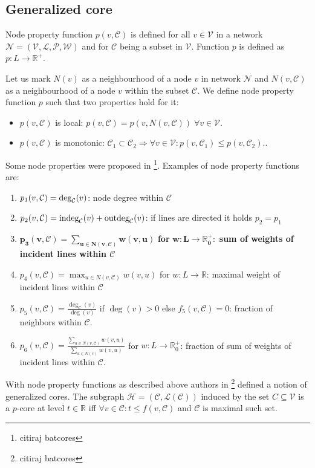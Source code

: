 \documentclass[a4paper,twoside,10pt]{article}
\newcommand{\Deg}{\mbox{\rm{deg}}}
\newcommand{\C}{\mathcal{C}}
\newcommand{\R}{\mathbb{R}}
\newcommand{\indeg}{\mbox{\rm{indeg}}}
\newcommand{\outdeg}{\mbox{\rm{outdeg}}}
\begin{document}
\subsection{Generalized core}

Node property function $p(v, \C)$ is defined for all $v \in \mathcal{V}$
in a network $\mathcal{N} = (\mathcal{V}, \mathcal{L}, \mathcal{P}, \mathcal{W})$ and for $\C$ being a subset in $\mathcal{V}$. Function $p$ is defined as $p: L \longrightarrow \R^+$.

Let us mark $N(v)$ as a neighbourhood of a node $v$ in network $\mathcal{N}$ and $N(v, \C)$ as a neighbourhood of a node $v$ within the subset $\C$. We define node property function $p$ such that two properties hold for it:
\begin{itemize}
\item $p(v, \C)$ is local: $p(v, \C) = p(v, N(v, \C)) \; \forall v \in \mathcal{V}$.
\item $p(v, \C)$ is monotonic: $\C_1 \subset \C_2 \Rightarrow \forall v \in \mathcal{V}: p(v, \C_1) \leq p(v, \C_2).$.
\end{itemize}

Some node properties were proposed in \footnote{citiraj batcores}. Examples of node property functions are:
\begin{enumerate}
\item $p_1 (v, \C) = \Deg_{\C}(v)$: node degree within $\C$
\item $p_2 (v, \C) = \indeg_{\C}(v) + \outdeg_{\C}(v)$: if lines are directed it holds $p_2 = p_1$
\item $\mathbf{p_3 (v, \C) = \sum_{u \in N(v, \C)} w(v,u)}$ \textbf{for} $\mathbf{w: L \rightarrow \mathbb{R}_0^+:}$ \textbf{sum of weights of incident lines within $\C$}
\item $p_4 (v, \C) = \max_{u \in N(v, \C)} w(v, u)$ for $w: L \rightarrow \mathbb{R}$: maximal weight of incident lines within $\C$
\item $p_5 (v, \C) = \frac{\deg_{\C}(v)}{\deg(v)}$ if $\deg(v) > 0$ else $f_5 (v, \C) = 0$: fraction of neighbors within $\C$.
\item $p_6 (v, \C) = \frac{\sum_{u \in N(v, \C)} w(v,u)}{\sum_{u \in N(v)} w(v,u)}$ for $w: L \rightarrow \mathbb{R}_0^+$: fraction of sum of weights of incident lines within $\C$.
\end{enumerate}


With node property functions as described above authors in \footnote{citiraj batcores} defined a notion of generalized cores. 
The subgraph $\mathcal{H} = (\C,\mathcal{L}(\C))$ induced by the set $C \subseteq \mathcal{V}$ is a $p$-core at level $t \in \mathbb{R}$ iff $\forall v \in \C : t \leq f(v, \C)$ and $\C$ is maximal such set.
\end{document}
